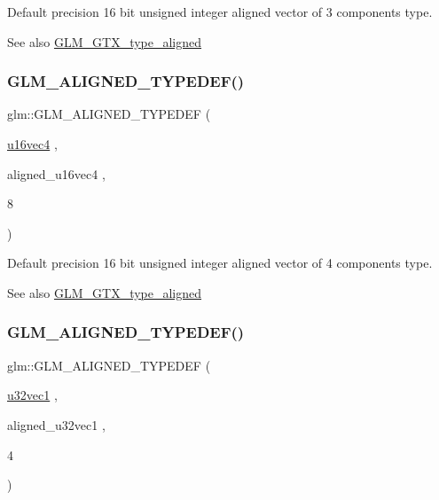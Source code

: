 Default precision 16 bit unsigned integer aligned vector of 3 components type. \begin{DoxySeeAlso}{See also}
\mbox{\hyperlink{group__gtx__type__aligned}{G\+L\+M\+\_\+\+G\+T\+X\+\_\+type\+\_\+aligned}} 
\end{DoxySeeAlso}
\mbox{\label{group__gtx__type__aligned_gaecafb5996f5a44f57e34d29c8670741e}} 
\subsubsection{\texorpdfstring{GLM\_ALIGNED\_TYPEDEF()}{GLM\_ALIGNED\_TYPEDEF()}\hspace{0.1cm}{\footnotesize\ttfamily [128/209]}}
{\footnotesize\ttfamily glm\+::\+G\+L\+M\+\_\+\+A\+L\+I\+G\+N\+E\+D\+\_\+\+T\+Y\+P\+E\+D\+EF (\begin{DoxyParamCaption}\item[{\mbox{\hyperlink{group__gtc__type__precision_ga87d1f39c523b4d6d4de0c2778afe5474}{u16vec4}}}]{,  }\item[{aligned\+\_\+u16vec4}]{,  }\item[{8}]{ }\end{DoxyParamCaption})}

Default precision 16 bit unsigned integer aligned vector of 4 components type. \begin{DoxySeeAlso}{See also}
\mbox{\hyperlink{group__gtx__type__aligned}{G\+L\+M\+\_\+\+G\+T\+X\+\_\+type\+\_\+aligned}} 
\end{DoxySeeAlso}
\mbox{\label{group__gtx__type__aligned_gac6b161a04d2f8408fe1c9d857e8daac0}} 
\subsubsection{\texorpdfstring{GLM\_ALIGNED\_TYPEDEF()}{GLM\_ALIGNED\_TYPEDEF()}\hspace{0.1cm}{\footnotesize\ttfamily [129/209]}}
{\footnotesize\ttfamily glm\+::\+G\+L\+M\+\_\+\+A\+L\+I\+G\+N\+E\+D\+\_\+\+T\+Y\+P\+E\+D\+EF (\begin{DoxyParamCaption}\item[{\mbox{\hyperlink{group__gtc__type__precision_ga09dd72852808c32ba398674736b9672a}{u32vec1}}}]{,  }\item[{aligned\+\_\+u32vec1}]{,  }\item[{4}]{ }\end{DoxyParamCaption})}

